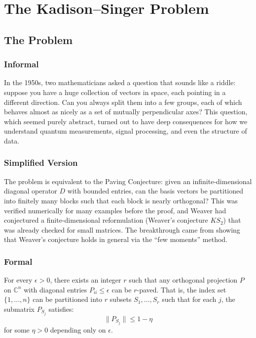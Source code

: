 \let\LocalMacro\relax

\chapter{The Kadison--Singer Problem}

\section{The Problem}

\subsection{Informal}
In the 1950s, two mathematicians asked a question that sounds like a riddle: suppose you have a huge collection of vectors in space, each pointing in a different direction. Can you always split them into a few groups, each of which behaves almost as nicely as a set of mutually perpendicular axes? This question, which seemed purely abstract, turned out to have deep consequences for how we understand quantum measurements, signal processing, and even the structure of data.

\subsection{Simplified Version}
The problem is equivalent to the Paving Conjecture: given an infinite-dimensional diagonal operator $D$ with bounded entries, can the basis vectors be partitioned into finitely many blocks such that each block is nearly orthogonal? This was verified numerically for many examples before the proof, and Weaver had conjectured a finite-dimensional reformulation (Weaver's conjecture $KS_2$) that was already checked for small matrices. The breakthrough came from showing that Weaver's conjecture holds in general via the ``few moments'' method.

\subsection{Formal}
\begin{conjecture}
For every $\epsilon > 0$, there exists an integer $r$ such that any orthogonal projection $P$ on $\mathbb{C}^n$ with diagonal entries $P_{ii} \leq \epsilon$ can be $r$-paved. That is, the index set $\{1, \ldots, n\}$ can be partitioned into $r$ subsets $S_1, \ldots, S_r$ such that for each $j$, the submatrix $P_{S_j}$ satisfies:
\begin{equation}
\|P_{S_j}\| \leq 1 - \eta
\end{equation}
for some $\eta > 0$ depending only on $\epsilon$.
\end{conjecture}

